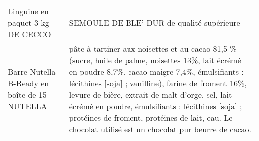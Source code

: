 \begin{longtable}{p{5cm}p{10cm}}
                                                                         Linguine en paquet 3 kg DE CECCO &                                                                                                                                                                                                                                                                                                                                                                                                                                                                                                                                                                                                                                                                                                                                                                                                                                                                                                                                                                                                SEMOULE DE BLE' DUR de qualité supérieure \\
                                                             Barre Nutella B-Ready en boîte de 15 NUTELLA &                                                                                                                                                                                                                                                                                                                                                                                                                                                                                                                                                                                                             pâte à tartiner aux noisettes et au cacao 81,5 \% (sucre, huile de palme, noisettes 13\%, lait écrémé en poudre 8,7\%, cacao maigre 7,4\%, émulsifiants : lécithines [soja] ; vanilline), farine de froment 16\%, levure de bière, extrait de malt d'orge, sel, lait écrémé en poudre, émulsifiants : lécithines [soja] ; protéines de froment, protéines de lait, eau.  Le chocolat utilisé est un chocolat pur beurre de cacao. \\

\end{longtable}
